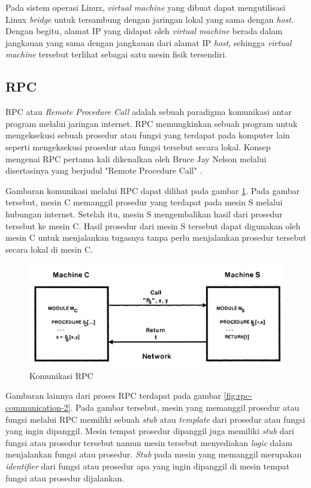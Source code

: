 Pada sistem operasi Linux, \emph{virtual machine} yang dibuat dapat mengutilisasi Linux
\emph{bridge} untuk tersambung dengan jaringan lokal yang sama dengan \emph{host}.
Dengan begitu, alamat IP yang didapat oleh \emph{virtual machine} berada dalam jangkauan
yang sama dengan jangkauan dari alamat IP \emph{host}, sehingga \emph{virtual machine} tersebut
terlihat sebagai satu mesin fisik tersendiri.

\subsection{RPC}

RPC atau \emph{Remote Procedure Call} adalah sebuah paradigma komunikasi antar program
melalui jaringan internet. RPC memungkinkan sebuah program untuk mengeksekusi sebuah
prosedur atau fungsi yang terdapat pada komputer lain seperti mengeksekusi prosedur
atau fungsi tersebut secara lokal. Konsep mengenai RPC pertama kali dikenalkan oleh
Bruce Jay Nelson melalui disertasinya yang berjudul "Remote Procedure Call" \parencite{rpc}.

Gambaran komunikasi melalui RPC dapat dilihat pada gambar \ref{fig:rpc-communication}.
Pada gambar tersebut, mesin C memanggil prosedur yang terdapat pada mesin S melalui
hubungan internet. Setelah itu, mesin S mengembalikan hasil dari prosedur tersebut
ke mesin C. Hasil prosedur dari mesin S tersebut dapat digunakan oleh
mesin C untuk menjalankan tugasnya tanpa perlu menjalankan prosedur tersebut
secara lokal di mesin C.

\begin{figure}[H]
  \centering
  \includegraphics[scale=0.3]{gambar/rpc-communication.png}
  \caption{Komunikasi RPC \parencite{rpc}}
  \label{fig:rpc-communication}
\end{figure}

Gambaran lainnya dari proses RPC terdapat pada gambar \ref{fig:rpc-communication-2}.
Pada gambar tersebut, mesin yang memanggil prosedur atau fungsi melalui RPC memiliki sebuah
\emph{stub} atau \emph{template} dari prosedur atau fungsi yang ingin dipanggil. Mesin
tempat prosedur dipanggil juga memiliki \emph{stub} dari fungsi atau prosedur tersebut namun
mesin tersebut menyediakan \emph{logic} dalam menjalankan fungsi atau prosedur. \emph{Stub}
pada mesin yang memanggil merupakan \emph{identifier} dari fungsi atau prosedur apa yang ingin
dipanggil di mesin tempat fungsi atau prosedur dijalankan.

